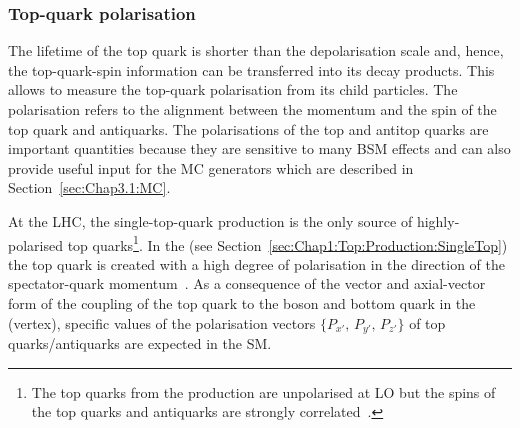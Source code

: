 \subsubsection{Top-quark polarisation}
\label{sec:Chap1:Top:Polarisation}
The lifetime of the top quark is shorter than the depolarisation scale
and, hence, the top-quark-spin information can be transferred into its decay products. This
allows to measure the top-quark polarisation from its child particles. The polarisation refers to 
the alignment between the momentum and the spin of the top quark and antiquarks.
The polarisations of the top and antitop quarks are important quantities because they are sensitive
to many BSM effects and can also provide useful input for the MC generators which are
described in Section~\ref{sec:Chap3.1:MC}.


At the LHC, the single-top-quark production is the only source of highly-polarised top quarks\footnote{The 
top quarks from the \ttbar production are unpolarised at LO but the spins of the top 
quarks and antiquarks are strongly correlated~\cite{CMS:2019nrx}.}. 
In the \tchannel (see Section~\ref{sec:Chap1:Top:Production:SingleTop}) the top
quark is created with a high degree of polarisation in the direction of the spectator-quark momentum~\cite{ATLAS:2022vym}.
As a consequence of the vector and axial-vector
form of the coupling of the top quark to the \PW boson
and bottom quark in the \tchannel (\tWb vertex), specific
values of the polarisation vectors $\{P_{x'},\, P_{y'},\, P_{z'}\}$ of top
quarks/antiquarks are expected in the SM.


